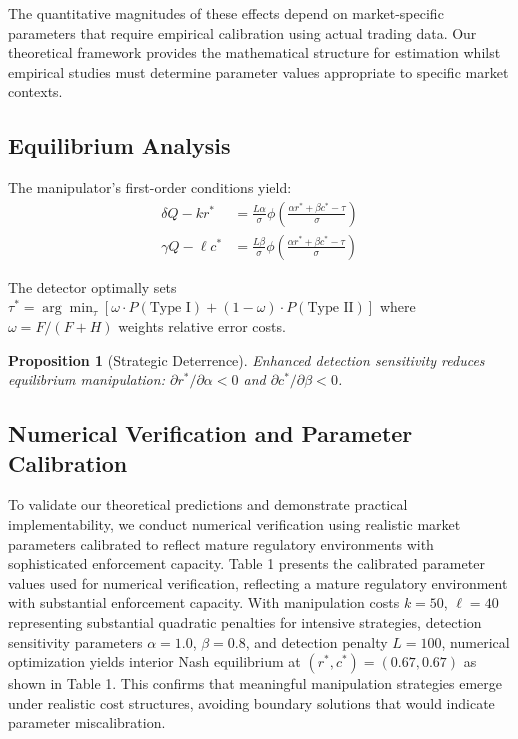 \documentclass[12pt]{article}
\newtheorem{proposition}[theorem]{Proposition}
\begin{document}
The quantitative magnitudes of these effects depend on market-specific parameters that require empirical calibration using actual trading data. Our theoretical framework provides the mathematical structure for estimation whilst empirical studies must determine parameter values appropriate to specific market contexts.

\subsection{Equilibrium Analysis}

The manipulator's first-order conditions yield:
\begin{align}
\delta Q - kr^* &= \frac{L\alpha}{\sigma} \phi\left(\frac{\alpha r^* + \beta c^* - \tau}{\sigma}\right) \\
\gamma Q - \ell c^* &= \frac{L\beta}{\sigma} \phi\left(\frac{\alpha r^* + \beta c^* - \tau}{\sigma}\right)
\end{align}

The detector optimally sets $\tau^* = \arg\min_\tau [\omega \cdot P(\text{Type I}) + (1-\omega) \cdot P(\text{Type II})]$ where $\omega = F/(F+H)$ weights relative error costs.

\begin{proposition}[Strategic Deterrence]
Enhanced detection sensitivity reduces equilibrium manipulation: $\partial r^*/\partial \alpha < 0$ and $\partial c^*/\partial \beta < 0$.
\end{proposition}

\subsection{Numerical Verification and Parameter Calibration}

To validate our theoretical predictions and demonstrate practical implementability, we conduct numerical verification using realistic market parameters calibrated to reflect mature regulatory environments with sophisticated enforcement capacity.  Table 1 presents the calibrated parameter values used for numerical verification, reflecting a mature regulatory environment with substantial enforcement capacity. With manipulation costs $k=50$, $\ell=40$ representing substantial quadratic penalties for intensive strategies, detection sensitivity parameters $\alpha=1.0$, $\beta=0.8$, and detection penalty $L=100$, numerical optimization yields interior Nash equilibrium at $(r^*, c^*) = (0.67, 0.67)$ as shown in Table 1. This confirms that meaningful manipulation strategies emerge under realistic cost structures, avoiding boundary solutions that would indicate parameter miscalibration.
\end{document}
